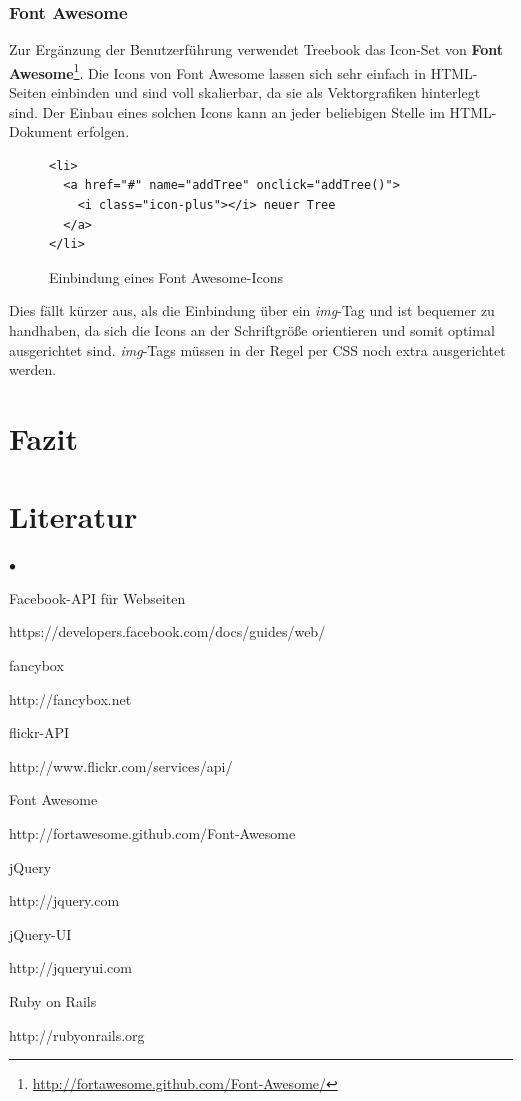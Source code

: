 \documentclass[10pt,a4paper]{book}
\begin{document}
\subsection{Font Awesome}
Zur Ergänzung der Benutzerführung verwendet Treebook das Icon-Set von \textbf{Font Awesome}\footnote{\href{http://fortawesome.github.com/Font-Awesome/}{http://fortawesome.github.com/Font-Awesome/}}.
Die Icons von Font Awesome lassen sich sehr einfach in HTML-Seiten einbinden und sind voll skalierbar, da sie als Vektorgrafiken hinterlegt sind.
Der Einbau eines solchen Icons kann an jeder beliebigen Stelle im HTML-Dokument erfolgen.
\begin{figure}[htbp]
\centering
\begin{lstlisting}
<li>
  <a href="#" name="addTree" onclick="addTree()">
    <i class="icon-plus"></i> neuer Tree
  </a>
</li>
\end{lstlisting}
\caption{Einbindung eines Font Awesome-Icons}%
\end{figure}
Dies fällt kürzer aus, als die Einbindung über ein \textit{img}-Tag und ist bequemer zu handhaben, da sich die Icons an der Schriftgröße orientieren und somit optimal ausgerichtet sind. \textit{img}-Tags müssen in der Regel per CSS noch extra ausgerichtet werden.

\chapter{Fazit}

\chapter{Literatur}
\begin{list}{$\bullet$}{}
\item Facebook-API für Webseiten

https://developers.facebook.com/docs/guides/web/
\item fancybox

http://fancybox.net
\item flickr-API

http://www.flickr.com/services/api/
\item Font Awesome

http://fortawesome.github.com/Font-Awesome
\item jQuery

http://jquery.com
\item jQuery-UI

http://jqueryui.com
\item Ruby on Rails

http://rubyonrails.org
\end{list}
\end{document}
